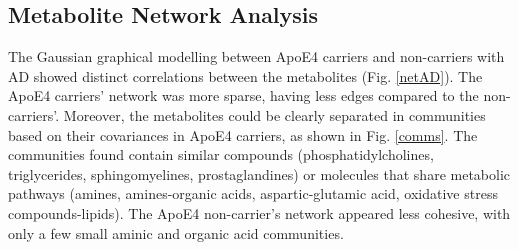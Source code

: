 \documentclass{amsart}
\begin{document}
\subsection{Metabolite Network Analysis}
The Gaussian graphical modelling between ApoE4 carriers and non-carriers with AD showed distinct correlations between the metabolites (Fig. \ref{netAD}). The ApoE4 carriers' network was more sparse, having less edges compared to the non-carriers'.  Moreover, the metabolites could be clearly separated in communities based on their covariances in ApoE4 carriers, as shown in Fig. \ref{comms}. The communities found contain similar compounds (phosphatidylcholines, triglycerides, sphingomyelines, prostaglandines) or molecules that share metabolic pathways (amines, amines-organic acids, aspartic-glutamic acid, oxidative stress compounds-lipids). The ApoE4 non-carrier's network appeared less cohesive, with only a few small aminic and organic acid communities.
\end{document}
